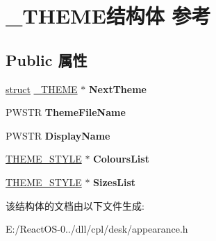 \hypertarget{struct___t_h_e_m_e}{}\section{\+\_\+\+T\+H\+E\+M\+E结构体 参考}
\label{struct___t_h_e_m_e}
\subsection*{Public 属性}
\begin{DoxyCompactItemize}
\item 
\mbox{\label{struct___t_h_e_m_e_a75ec9c581ca0590b2d9576836e08e13d}} 
\hyperlink{interfacestruct}{struct} \hyperlink{struct___t_h_e_m_e}{\+\_\+\+T\+H\+E\+ME} $\ast$ {\bfseries Next\+Theme}
\item 
\mbox{\label{struct___t_h_e_m_e_a4ca8379fdcad5137aace7a7f43d68cca}} 
P\+W\+S\+TR {\bfseries Theme\+File\+Name}
\item 
\mbox{\label{struct___t_h_e_m_e_a85157a408b7407b773a0d9e44949b902}} 
P\+W\+S\+TR {\bfseries Display\+Name}
\item 
\mbox{\label{struct___t_h_e_m_e_a281d8ecefd74b317d2b7f3cf14d91faf}} 
\hyperlink{struct___t_h_e_m_e___s_t_y_l_e}{T\+H\+E\+M\+E\+\_\+\+S\+T\+Y\+LE} $\ast$ {\bfseries Colours\+List}
\item 
\mbox{\label{struct___t_h_e_m_e_a08aa08a021b82b71211d25cbc4d2a712}} 
\hyperlink{struct___t_h_e_m_e___s_t_y_l_e}{T\+H\+E\+M\+E\+\_\+\+S\+T\+Y\+LE} $\ast$ {\bfseries Sizes\+List}
\end{DoxyCompactItemize}


该结构体的文档由以下文件生成\+:\begin{DoxyCompactItemize}
\item 
E\+:/\+React\+O\+S-\/0../dll/cpl/desk/appearance.\+h\end{DoxyCompactItemize}
